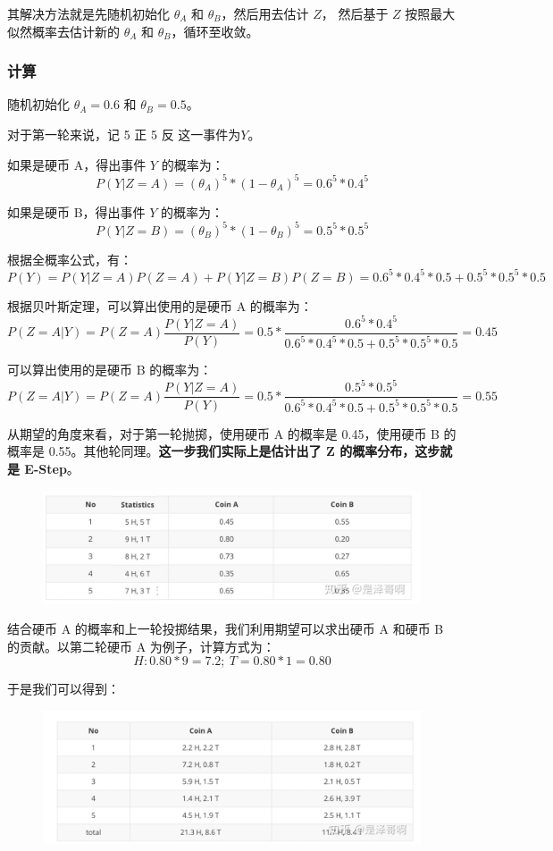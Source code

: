 \documentclass[12pt]{article}
\begin{document}
其解决方法就是先随机初始化 $\theta_A$  和 $\theta_B$，然后用去估计 $Z$， 然后基于 $Z$ 按照最大似然概率去估计新的 $\theta_A$  和 $\theta_B$，循环至收敛。

\subsubsection{计算}
随机初始化 $\theta_A = 0.6$  和 $\theta_B = 0.5$。


对于第一轮来说，记 5 正 5 反 这一事件为$Y$。

如果是硬币 A，得出事件 $Y$ 的概率为：
$$
P(Y|Z=A) = (\theta_A)^5 * (1-\theta_A)^5 = 0.6^5*0.4^5
$$

如果是硬币 B，得出事件 $Y$ 的概率为： 
$$
P(Y|Z=B) = (\theta_B)^5 * (1-\theta_B)^5 = 0.5^5*0.5^5
$$

根据全概率公式，有：
$$
P(Y) = P(Y|Z=A)P(Z=A) + P(Y|Z=B)P(Z=B) = 0.6^5*0.4^5*0.5 + 0.5^5*0.5^5*0.5
$$

根据贝叶斯定理，可以算出使用的是硬币 A 的概率为：
$$
P(Z=A|Y) = P(Z=A)\frac{P(Y|Z=A)}{P(Y)} = 0.5 * \frac{0.6^5*0.4^5}{0.6^5*0.4^5*0.5 + 0.5^5*0.5^5*0.5} = 0.45
$$

可以算出使用的是硬币 B 的概率为：
$$
P(Z=A|Y) = P(Z=A)\frac{P(Y|Z=A)}{P(Y)} = 0.5 * \frac{0.5^5*0.5^5}{0.6^5*0.4^5*0.5 + 0.5^5*0.5^5*0.5} = 0.55$$

从期望的角度来看，对于第一轮抛掷，使用硬币 A 的概率是 0.45，使用硬币 B 的概率是 0.55。其他轮同理。\textbf{这一步我们实际上是估计出了 Z 的概率分布，这步就是 E-Step}。
\begin{figure}[H]
    \centering
    \includegraphics[width=.8\textwidth]{fig/EM_Detailed_Example_A_3.png}
\end{figure}

结合硬币 A 的概率和上一轮投掷结果，我们利用期望可以求出硬币 A 和硬币 B 的贡献。以第二轮硬币 A 为例子，计算方式为：
$$
H: 0.80 * 9 = 7.2; \ T = 0.80 * 1 = 0.80
$$

于是我们可以得到：
\begin{figure}[H]
    \centering
    \includegraphics[width=.8\textwidth]{fig/EM_Detailed_Example_A_4.png}
\end{figure}
\end{document}
